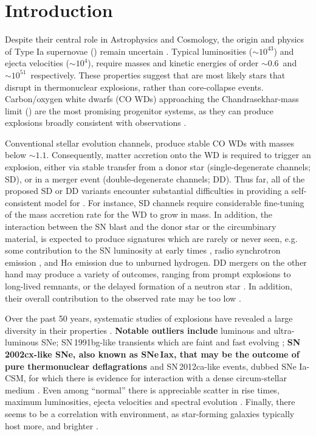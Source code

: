 \documentclass[twocolumn]{aa}
\begin{document}
\section{Introduction} \label{sec:intro}

 Despite their central role in Astrophysics and Cosmology, 
 the origin and physics of Type Ia supernovae (\ias)
remain uncertain  \citep[][]{Maoz:2013hna}. 
Typical \ia  luminosities ($\sim 10^{43}$\ergs) and ejecta velocities  
($ \sim 10^{4}$\kms), require   
masses and kinetic energies of order 
$\sim 0.6$\msun\ and $\sim 10^{51}$\erg\ respectively. 
 These properties suggest that \ias are most likely 
 stars that disrupt in  thermonuclear explosions, 
 rather than core-collapse events. 
 Carbon/oxygen white dwarfs (CO WDs) 
 approaching the Chandrasekhar-mass limit (\mch)
 are the most promising progenitor systems, as they can
 produce explosions broadly consistent with observations
 \citep{Nomoto:1982zz,Churazov:2014bga}. %
 
Conventional stellar evolution channels, produce stable CO WDs with masses below $\sim 1.1$\msun. 
Consequently, matter accretion onto the WD is required to trigger an 
explosion, either via stable  transfer from a 
donor star (single-degenerate channels; SD), or in a 
merger event (double-degenerate channels; DD).  
Thus far, all of the proposed SD or DD variants    
encounter substantial difficulties in providing 
a self-consistent model for \ias \citep{Livio:2018rue}. 
For instance, SD channels require considerable fine-tuning
of the mass accretion rate for
the WD to grow in mass. In addition, the interaction between  
the SN blast and the donor star or the circumbinary material, is expected to produce  signatures which 
are rarely or never seen, e.g. some contribution to the SN  luminosity 
at early times \citep{Kasen:2009si}, radio synchrotron emission 
\citep{Harris:2016hfr}, and H$\alpha$ emission due to unburned hydrogen. 
DD mergers on the other hand may produce a variety of outcomes, 
ranging from prompt 
explosions to long-lived remnants, or the delayed formation of a neutron star \citep{Livio:2018rue}. 
In addition, their overall contribution to the observed \ia rate may be too low \citep{vanKerkwijk:2010he,claeys2014a,Sato:2015spa}. %

Over the past 50 years, systematic studies of \ia explosions have revealed a large
diversity in their properties \citep{Taubenberger:2017hoo}. 
{\bf Notable outliers include} luminous 
\citep[e.g. SN\,1991T;][]{filippenko1992} and ultra-luminous  
\citep[e.g. SNLS-03D3bb;][]{Howell:2006vn} SNe; SN\,1991bg-like transients which
are faint and fast evolving  \citep{ruiz-lapuente1993}; {\bf SN 2002cx-like SNe, 
also known as SNe\,Iax, that may be the outcome of pure thermonuclear deflagrations \citep{Jha:2017gwq}}
and SN\,2012ca-like events, dubbed SNe Ia-CSM, for which 
there is evidence for interaction with a dense circum-stellar 
medium \citep{Bochenek:2017vok}. 
Even among ``normal'' \ias there is appreciable
scatter in rise times, maximum luminosities, ejecta velocities and spectral evolution   
\citep[][]{Livio:2018rue}. 
Finally, there seems to be a correlation with environment, 
as star-forming  galaxies typically  host more,  and brighter \ias \citep{Maoz:2013hna}. 
\end{document}

